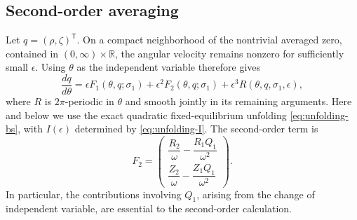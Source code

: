 \documentclass[11pt]{amsart}
\theoremstyle{remark}
\newcommand{\R}{\mathbb{R}}
\begin{document}
\subsection{Second-order averaging}

Let \(q=(\rho,\zeta)^{\mathsf T}\).  On a compact neighborhood of the
nontrivial averaged zero, contained in \((0,\infty)\times\R\), the angular
velocity remains nonzero for sufficiently small \(\epsilon\).  Using
\(\theta\) as the independent variable therefore gives
\begin{equation}\label{eq:second-order-reduced}
 \frac{dq}{d\theta}
 =\epsilon F_1(\theta,q;\sigma_1)
  +\epsilon^2F_2(\theta,q;\sigma_1)
  +\epsilon^3R(\theta,q,\sigma_1,\epsilon),
\end{equation}
where \(R\) is \(2\pi\)-periodic in \(\theta\) and smooth jointly in its
remaining arguments.  Here and below we use the exact quadratic
fixed-equilibrium unfolding \eqref{eq:unfolding-bs}, with
\(I(\epsilon)\) determined by \eqref{eq:unfolding-I}.  The second-order term
is
\begin{equation}\label{eq:F2}
 F_2=
 \begin{pmatrix}
 \dfrac{R_2}{\omega}-\dfrac{R_1Q_1}{\omega^2}\\[3mm]
 \dfrac{Z_2}{\omega}-\dfrac{Z_1Q_1}{\omega^2}
 \end{pmatrix}.
\end{equation}
In particular, the contributions involving \(Q_1\), arising from the change
of independent variable, are essential to the second-order calculation.
\end{document}
